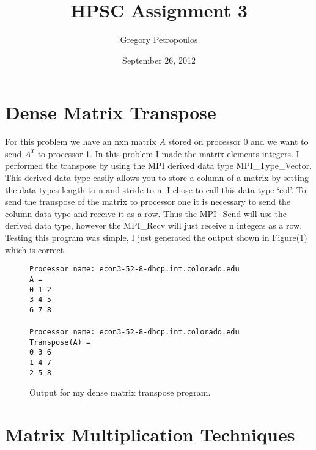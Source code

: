 \documentclass[11pt,a4paper,oneside]{report}
\begin{document}
\title{HPSC Assignment 3}
\author{Gregory Petropoulos}
\date{September 26, 2012}
\maketitle

\section{Dense Matrix Transpose}

For this problem we have an nxn matrix $A$ stored on processor 0 and we want to send $A^T$ to processor 1.  In this problem I made the matrix elements integers.  I performed the transpose by using the MPI derived data type MPI\_Type\_Vector.  This derived data type easily allows you to store a column of a matrix by setting the data types length to n and stride to n.  I chose to call this data type `col'.  To send the transpose of the matrix to processor one it is necessary to send the column data type and receive it as a row.  Thus the MPI\_Send will use the derived data type, however the MPI\_Recv will just receive n integers as a row.  Testing this program was simple, I just generated the output shown in Figure(\ref{fig:transpose}) which is correct.

\begin{figure}[htpb]
  \texttt{Processor name:  econ3-52-8-dhcp.int.colorado.edu\\}
  \texttt{A =\\}
  \texttt{0 1 2 \\}
  \texttt{3 4 5 \\}
  \texttt{6 7 8 \\\\}
  \texttt{Processor name:  econ3-52-8-dhcp.int.colorado.edu\\}
  \texttt{Transpose(A) =\\}
  \texttt{0 3 6 \\}
  \texttt{1 4 7 \\}
  \texttt{2 5 8 \\}
  \caption{Output for my dense matrix transpose program.}
  \label{fig:transpose}
\end{figure}

\section{Matrix Multiplication Techniques}
\end{document}
